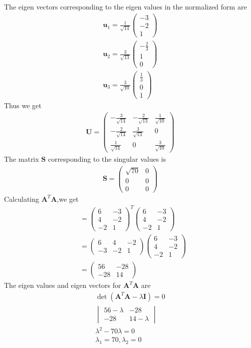 \documentclass[journal,12pt,twocolumn]{IEEEtran}
\providecommand{\brak}[1]{\ensuremath{\left(#1\right)}}
\newcommand{\myvec}[1]{\ensuremath{\begin{pmatrix}#1\end{pmatrix}}}
\numberwithin{equation}{subsection}
\let\vec\mathbf
\begin{document}
The eigen vectors corresponding to the eigen values in the normalized form are
\begin{align}
    \vec{u}_1=\frac{1}{\sqrt{14}}\myvec{-3\\-2\\1}\\
    \vec{u}_2=\frac{3}{\sqrt{13}}\myvec{-\frac{2}{3}\\1\\0}\\
    \vec{u}_3=\frac{3}{\sqrt{10}}\myvec{\frac{1}{3}\\0\\1}
\end{align}
Thus we get
\begin{align}
    \vec{U}=\myvec{-\frac{3}{\sqrt{14}}&-\frac{2}{\sqrt{13}}&\frac{1}{\sqrt{10}}\\-\frac{2}{\sqrt{14}}&\frac{3}{\sqrt{13}}&0\\\frac{1}{\sqrt{14}}&0&\frac{3}{\sqrt{10}}}
\end{align}
The matrix $\vec{S}$ corresponding to the singular values is
\begin{align}
    \vec{S}=\myvec{\sqrt{70}&0\\0&0\\0&0}
\end{align}
Calculating $\vec{A}^T\vec{A}$,we get
\begin{align}
    &=\myvec{6&-3\\4&-2\\-2&1}^T\myvec{6&-3\\4&-2\\-2&1}\\
    &=\myvec{6&4&-2\\-3&-2&1}\myvec{6&-3\\4&-2\\-2&1}\\
    &=\myvec{56&-28\\-28&14}
\end{align}
The eigen values and eigen vectors for $\vec{A}^T\vec{A}$ are
\begin{align}
    \det \brak{\vec{A}^T\vec{A}-\lambda\vec{I}}=0\\
    \begin{vmatrix}56-\lambda&-28\\-28&14-\lambda\end{vmatrix}\\
    \lambda^2-70\lambda=0\\
    \lambda_1=70,\lambda_2=0
\end{align}
\end{document}
